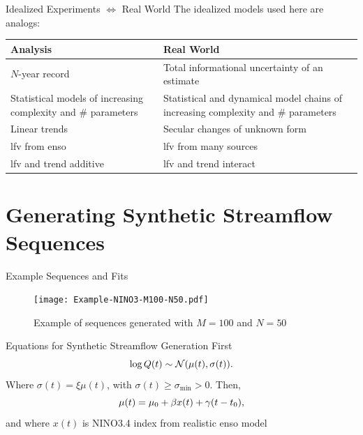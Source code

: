 \documentclass[
  10pt,     %
]{beamer}
\newcommand{\normal}{\mathcal{N}}
\begin{document}
\begin{frame}{Idealized Experiments $\iff$ Real World}
  The idealized models used here are analogs:
  \begin{table}
    \centering
    \begin{tabular}{L{0.425\textwidth}L{0.525\textwidth}}
      \toprule
      Analysis & Real World \\\midrule
      $N$-year record & Total informational uncertainty of an estimate \\\midrule
      Statistical models of increasing complexity and \# parameters & Statistical and dynamical model chains of increasing complexity and \# parameters \\\midrule
      Linear trends & Secular changes of unknown form \\\midrule
      \gls{lfv} from \gls{enso} & \gls{lfv} from many sources \\\midrule
      \gls{lfv} and trend additive & \gls{lfv} and trend interact \\
      \bottomrule
    \end{tabular}
  \end{table}
\end{frame}

\section{Generating Synthetic Streamflow Sequences}

\begin{frame}{Example Sequences and Fits}
  \begin{figure}
    \texttt{[image: Example-NINO3-M100-N50.pdf]}
    \caption{Example of sequences generated with $M=100$ and $N=50$}
  \end{figure}
\end{frame}

\begin{frame}{Equations for Synthetic Streamflow Generation}
  First
  \begin{equation} \label{eq:lognormal}
    \log Q(t) \sim \normal \qty(\mu(t), \sigma(t)).
  \end{equation}
  Where $\sigma(t) = \xi \mu(t)$, with $\sigma(t) \geq \sigma_\text{min} > 0$.
  Then,
  \begin{equation}\label{eq:nino3}
    \mu(t) = \mu_0 + \beta x(t) + \gamma \qty(t - t_0),
  \end{equation}
  and where $x(t)$ is NINO3.4 index from realistic \gls{enso} model \citep{Zebiak:1987cl,Ramesh:2016hf}
\end{frame}
\end{document}
